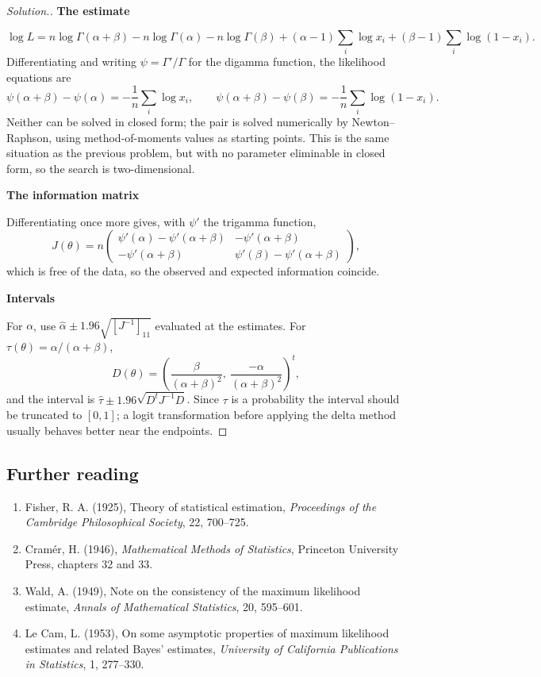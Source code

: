 \documentclass[12pt,a4paper]{report}
\theoremstyle{definition}
\newcommand{\subhead}[1]{%
  \par\medskip\noindent\textbf{#1}\par\nobreak\smallskip}
\newenvironment{solution}
  {\renewcommand{\qedsymbol}{}\begin{proof}[\textit{Solution}.]}
  {\end{proof}}
\begin{document}
\begin{solution}
\subhead{The estimate}
\[\log L = n\log\Gamma(\alpha+\beta) - n\log\Gamma(\alpha) - n\log\Gamma(\beta)
+ (\alpha-1)\sum_i\log x_i + (\beta-1)\sum_i\log(1-x_i).\]
Differentiating and writing $\psi=\Gamma'/\Gamma$ for the digamma function, the
likelihood equations are
\[\psi(\alpha+\beta)-\psi(\alpha) = -\frac{1}{n}\sum_i\log x_i,\qquad
\psi(\alpha+\beta)-\psi(\beta) = -\frac{1}{n}\sum_i\log(1-x_i).\]
Neither can be solved in closed form; the pair is solved numerically by
Newton--Raphson, using method-of-moments values as starting points. This is the
same situation as the previous problem, but with no parameter eliminable in
closed form, so the search is two-dimensional.

\subhead{The information matrix}
Differentiating once more gives, with $\psi'$ the trigamma function,
\[J(\theta) = n\begin{pmatrix}
\psi'(\alpha)-\psi'(\alpha+\beta) & -\psi'(\alpha+\beta)\\
-\psi'(\alpha+\beta) & \psi'(\beta)-\psi'(\alpha+\beta)\end{pmatrix},\]
which is free of the data, so the observed and expected information coincide.

\subhead{Intervals}
For $\alpha$, use $\widehat{\alpha}\pm1.96\sqrt{\left[J^{-1}\right]_{11}}$
evaluated at the estimates. For $\tau(\theta)=\alpha/(\alpha+\beta)$,
\[D(\theta) = \left(\frac{\beta}{(\alpha+\beta)^{2}},\ \frac{-\alpha}{(\alpha+\beta)^{2}}\right)^{t},\]
and the interval is $\widehat{\tau}\pm1.96\sqrt{D^{t}J^{-1}D}$. Since $\tau$ is
a probability the interval should be truncated to $[0,1]$; a logit
transformation before applying the delta method usually behaves better near the
endpoints.
\end{solution}

\subsection*{Further reading}
\begin{enumerate}
\item Fisher, R. A. (1925), Theory of statistical estimation, \emph{Proceedings of
the Cambridge Philosophical Society}, 22, 700--725.
\item Cram\'er, H. (1946), \emph{Mathematical Methods of Statistics}, Princeton
University Press, chapters 32 and 33.
\item Wald, A. (1949), Note on the consistency of the maximum likelihood estimate,
\emph{Annals of Mathematical Statistics}, 20, 595--601.
\item Le Cam, L. (1953), On some asymptotic properties of maximum likelihood
estimates and related Bayes' estimates, \emph{University of California
Publications in Statistics}, 1, 277--330.
\end{enumerate}
\end{document}

